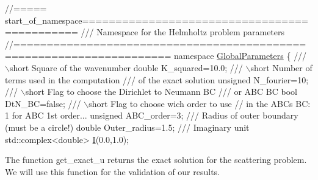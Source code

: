  
\begin{DoxyCodeInclude}
\textcolor{comment}{//===== start\_of\_namespace=============================================}
\textcolor{comment}{/// Namespace for the Helmholtz problem parameters}
\textcolor{comment}{}\textcolor{comment}{//=====================================================================}
\textcolor{keyword}{namespace }\hyperlink{namespaceGlobalParameters}{GlobalParameters}
\{\textcolor{comment}{}
\textcolor{comment}{ /// \(\backslash\)short Square of the wavenumber}
\textcolor{comment}{} \textcolor{keywordtype}{double} K\_squared=10.0; 
 \textcolor{comment}{}
\textcolor{comment}{ /// \(\backslash\)short Number of terms used in the computation }
\textcolor{comment}{ /// of the exact solution}
\textcolor{comment}{} \textcolor{keywordtype}{unsigned} N\_fourier=10;
 \textcolor{comment}{}
\textcolor{comment}{ /// \(\backslash\)short Flag to choose the Dirichlet to Neumann BC}
\textcolor{comment}{ /// or ABC BC}
\textcolor{comment}{} \textcolor{keywordtype}{bool} DtN\_BC=\textcolor{keyword}{false};
\textcolor{comment}{}
\textcolor{comment}{ /// \(\backslash\)short Flag to choose wich order to use}
\textcolor{comment}{} \textcolor{comment}{// in the ABCs BC: 1 for ABC 1st order...}
 \textcolor{keywordtype}{unsigned} ABC\_order=3;
\textcolor{comment}{}
\textcolor{comment}{ /// Radius of outer boundary (must be a circle!)}
\textcolor{comment}{} \textcolor{keywordtype}{double} Outer\_radius=1.5;
\textcolor{comment}{}
\textcolor{comment}{ /// Imaginary unit }
\textcolor{comment}{} std::complex<double> \hyperlink{namespaceGlobalParameters_a7642bd7303d39de0d680340586b7df60}{I}(0.0,1.0);

\end{DoxyCodeInclude}


The function {\ttfamily get\+\_\+exact\+\_\+u} returns the exact solution for the scattering problem. We will use this function for the validation of our results.

